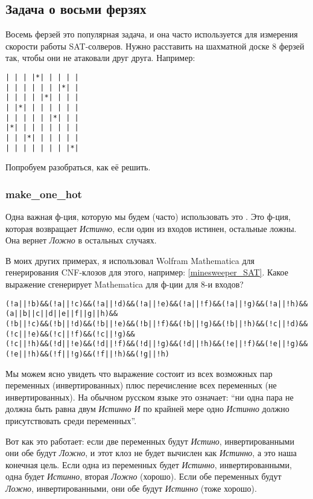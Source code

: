 \subsection{Задача о восьми ферзях}
\label{EightQueens}

Восемь ферзей это популярная задача, и она часто используется для измерения скорости работы SAT-солверов.
Нужно расставить на шахматной доске 8 ферзей так, чтобы они не атаковали друг друга.
Например:

\begin{lstlisting}
| | | |*| | | | |
| | | | | | |*| |
| | | | |*| | | |
| |*| | | | | | |
| | | | | |*| | |
|*| | | | | | | |
| | |*| | | | | |
| | | | | | | |*|
\end{lstlisting}

Попробуем разобраться, как её решить.

\subsubsection{make\_one\_hot}
\label{POPCNTOne}

Одна важная ф-ция, которую мы будем (часто) использовать это .
Это ф-ция, которая возвращает \textit{Истинно}, если один из входов истинен, остальные ложны.
Она вернет \textit{Ложно} в остальных случаях.

В моих других примерах, я использовал Wolfram Mathematica для генерирования CNF-клозов для этого, например: \ref{minesweeper_SAT}.
Какое выражение сгенерирует Mathematica для ф-ции  для 8-и входов?

\begin{lstlisting}
(!a||!b)&&(!a||!c)&&(!a||!d)&&(!a||!e)&&(!a||!f)&&(!a||!g)&&(!a||!h)&&(a||b||c||d||e||f||g||h)&&
(!b||!c)&&(!b||!d)&&(!b||!e)&&(!b||!f)&&(!b||!g)&&(!b||!h)&&(!c||!d)&&(!c||!e)&&(!c||!f)&&(!c||!g)&&
(!c||!h)&&(!d||!e)&&(!d||!f)&&(!d||!g)&&(!d||!h)&&(!e||!f)&&(!e||!g)&&(!e||!h)&&(!f||!g)&&(!f||!h)&&(!g||!h)
\end{lstlisting}

Мы можем ясно увидеть что выражение состоит из всех возможных пар переменных (инвертированных) плюс
перечисление всех переменных (не инвертированных).
На обычном русском языке это означает: ``ни одна пара не должна быть равна двум \textit{Истинно} \textit{И}
по крайней мере одно \textit{Истинно} должно
присутствовать среди переменных''.

Вот как это работает: если две переменных будут \textit{Истино}, инвертированными они обе будут \textit{Ложно},
и этот клоз не будет
вычислен как \textit{Истинно}, а это наша конечная цель.
Если одна из переменных будет \textit{Истинно}, инвертированными, одна будет \textit{Истинно},
вторая \textit{Ложно} (хорошо).
Если обе переменных будут \textit{Ложно}, инвертированными, они обе будут \textit{Истинно} (тоже хорошо).

